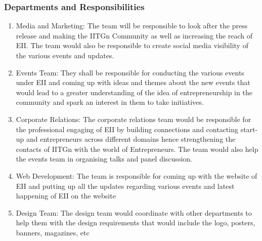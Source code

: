 \documentclass[12pt]{article}
\begin{document}
\subsubsection{Departments and Responsibilities}
\begin{enumerate}
    \item Media and Marketing: The team will be responsible to look after the press release and making the IITGn Community as well as increasing the reach of EII. The team would also be responsible to create social media visibility of the various events and updates.
    \item Events Team: They shall be responsible for conducting the various events under EII and coming up with ideas and themes about the new events that would lead to a greater understanding of the idea of entrepreneurship in the community and spark an interest in them to take initiatives.
    \item Corporate Relations: The corporate relations team would be responsible for the professional engaging of EII by building connections and contacting start-up and entrepreneurs across different domains hence strengthening the contacts of IITGn with the world of Entrepreneurs. The team would also help the events team in organising talks and panel discussion.
    \item Web Development: The team is responsible for coming up with the website of EII and putting up all the updates regarding various events and latest happening of EII on the website
    \item Design Team: The design team would coordinate with other departments to help them with the design requirements that would include the logo, posters, banners, magazines, etc
\end{enumerate}
\end{document}
